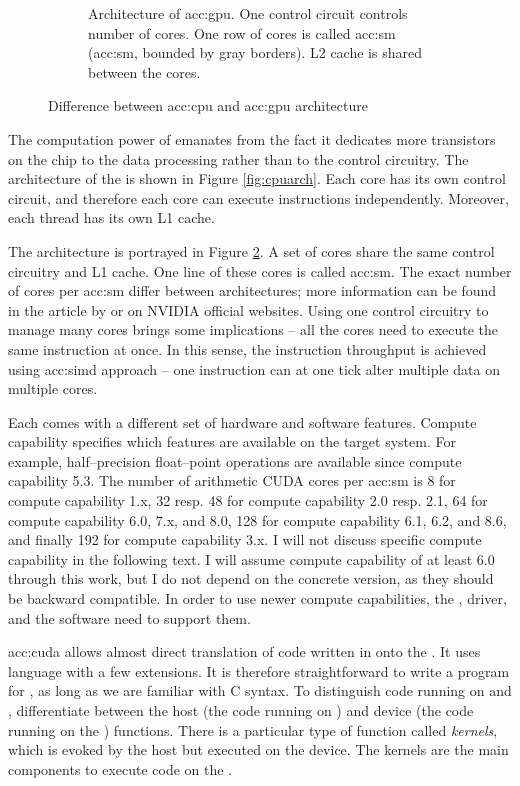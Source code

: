 \begin{figure}
\begin{subfigure}[t]{0.47\textwidth}
        \caption{Architecture of \acrshort*{acc:gpu}. One control circuit controls number of cores. One row of cores is called \acrlong{acc:sm} (\acrshort{acc:sm}, bounded by gray borders). L2 cache is shared between the cores.}
        \label{fig:gpuarch}
    \end{subfigure}
    \caption{Difference between \acrshort*{acc:cpu} and \acrshort*{acc:gpu} architecture}
\end{figure}

The computation power of \gpu emanates from the fact it dedicates more transistors on the chip to the data processing rather than to the control circuitry. The architecture of the \cpu is shown in Figure \ref{fig:cpuarch}. Each core has its own control circuit, and therefore each core can execute instructions independently. Moreover, each thread has its own L1 cache.

The \gpu{} architecture is portrayed in Figure \ref{fig:gpuarch}. A set of cores share the same control circuitry and L1 cache. One line of these cores is called \acrfull{acc:sm}. The exact number of cores per \acrshort{acc:sm} differ between architectures; more information can be found in the article by \citet{NVIDIAhistory} or on NVIDIA official websites. Using one control circuitry to manage many cores brings some implications -- all the cores need to execute the same instruction at once. In this sense, the instruction throughput is achieved using \acrfull{acc:simd} approach -- one instruction can at one tick alter multiple data on multiple cores.

Each \gpu comes with a different set of hardware and software features. Compute capability specifies which features are available on the target system. For example, half--precision float--point operations are available since compute capability 5.3. The number of arithmetic CUDA cores per \acrshort{acc:sm} is 8 for compute capability 1.x, 32 resp. 48 for compute capability 2.0 resp. 2.1, 64 for compute capability 6.0, 7.x, and 8.0, 128 for compute capability 6.1, 6.2, and 8.6, and finally 192 for compute capability 3.x. I will not discuss specific compute capability in the following text. I will assume compute capability of at least 6.0 through this work, but I do not depend on the concrete version, as they should be backward compatible. In order to use newer compute capabilities, the \gpu, driver, and the software need to support them.

\acrlong{acc:cuda} allows almost direct translation of code written in \cpp onto the \gpuns. It uses \cpp language with a few extensions. It is therefore straightforward to write a program for \gpuns, as long as we are familiar with C syntax. To distinguish code running on \cpu and \gpu, \cuda differentiate between the host (the code running on \cpuns) and device (the code running on the \gpuns) functions. There is a particular type of function called \emph{kernels}, which is evoked by the host but executed on the device. The kernels are the main components to execute code on the \gpuns.

